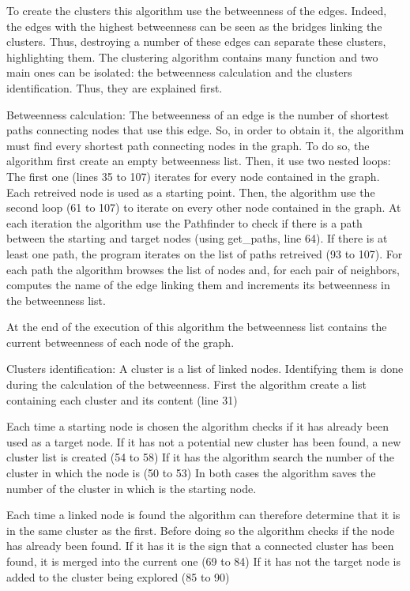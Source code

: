 \documentclass[12pt,english]{article}
\begin{document}
	To create the clusters this algorithm use the betweenness of the edges.
	Indeed, the edges with the highest betweenness can be seen as the bridges linking the clusters.
	Thus, destroying a number of these edges can separate these clusters, highlighting them.
	The clustering algorithm contains many function and two main ones can be isolated: the betweenness calculation and
	the clusters identification. Thus, they are explained first.


	Betweenness calculation:
	The betweenness of an edge is the number of shortest paths connecting nodes that use this edge.
	So, in order to obtain it, the algorithm must find every shortest path connecting nodes in the graph.
	To do so, the algorithm first create an empty betweenness list. Then, it use two nested loops:
	The first one (lines 35 to 107) iterates for every node contained in the graph.
	Each retreived node is used as a starting point.
	Then, the algorithm use the second loop (61 to 107) to iterate on every other node contained in the graph.
	At each iteration the algorithm use the Pathfinder to check if there is a path between the starting and target nodes
	(using get_paths, line 64).
	If there is at least one path, the program iterates on the list of paths retreived (93 to 107).
	For each path the algorithm browses the list of nodes and, for each pair of neighbors, computes the name of
	the edge linking them and increments its betweenness in the betweenness list.

	At the end of the execution of this algorithm the betweenness list contains the current betweenness of each node of
	the graph.


	Clusters identification:
	A cluster is a list of linked nodes. Identifying them is done during the calculation of the betweenness.
	First the algorithm create a list containing each cluster and its content (line 31)

	Each time a starting node is chosen the algorithm checks if it has already been used as a target node.
	If it has not a potential new cluster has been found, a new cluster list is created (54 to 58)
	If it has the algorithm search the number of the cluster in which the node is (50 to 53)
	In both cases the algorithm saves the number of the cluster in which is the starting node.

	Each time a linked node is found the algorithm can therefore determine that it is in the same cluster as the first.
	Before doing so the algorithm checks if the node has already been found.
	If it has it is the sign that a connected cluster has been found, it is merged into the current one (69 to 84)
	If it has not the target node is added to the cluster being explored (85 to 90)
\end{document}
